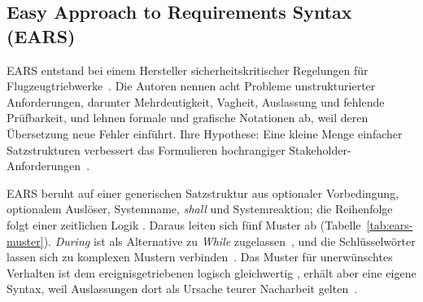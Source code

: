 \documentclass[11pt,a4paper]{report}
\begin{document}
\subsection{Easy Approach to Requirements Syntax (EARS)}
\label{sec:ears}

EARS entstand bei einem Hersteller sicherheitskritischer Regelungen für
Flugzeugtriebwerke~\cite{mavin2009ears}. Die Autoren nennen acht
Probleme unstrukturierter Anforderungen, darunter Mehrdeutigkeit,
Vagheit, Auslassung und fehlende Prüfbarkeit, und lehnen formale und
grafische Notationen ab, weil deren Übersetzung neue Fehler einführt.
Ihre Hypothese: Eine kleine Menge einfacher Satzstrukturen verbessert
das Formulieren hochrangiger
Stakeholder-Anforderungen~\cite[Abschn.~2]{mavin2009ears}.

EARS beruht auf einer generischen Satzstruktur aus optionaler
Vorbedingung, optionalem Auslöser, Systemname, \textit{shall} und
Systemreaktion; die Reihenfolge folgt einer zeitlichen Logik
\cite[Abschn.~4.1]{mavin2009ears}. Daraus leiten sich fünf Muster ab
(Tabelle~\ref{tab:ears-muster}). \textit{During} ist als Alternative zu
\textit{While} zugelassen~\cite[Abschn.~4.5]{mavin2009ears}, und die
Schlüsselwörter lassen sich zu komplexen Mustern
verbinden~\cite[Abschn.~4.7]{mavin2009ears}. Das Muster für
unerwünschtes Verhalten ist dem ereignisgetriebenen logisch
gleichwertig \cite[Abschn.~EARS Templates]{mavin2010bigears}, erhält
aber eine eigene Syntax, weil Auslassungen dort als Ursache teurer
Nacharbeit gelten~\cite[Abschn.~4.4]{mavin2009ears}.
\end{document}
